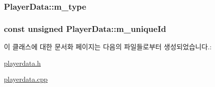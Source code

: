 \hypertarget{class_player_data_a3e4b8d9fcda3d2def5f0a79468a87903}{
\subsubsection[{m\-\_\-type}]{ Player\-Data\-::m\-\_\-type\hspace{0.3cm}{\ttfamily [private]}}}\label{class_player_data_a3e4b8d9fcda3d2def5f0a79468a87903}
\hypertarget{class_player_data_a2b6ed5c114b242c39eab3ec7c6622a5f}{
\subsubsection[{m\-\_\-unique\-Id}]{\setlength{\rightskip}{0pt plus 5cm}const unsigned Player\-Data\-::m\-\_\-unique\-Id\hspace{0.3cm}{\ttfamily [private]}}}\label{class_player_data_a2b6ed5c114b242c39eab3ec7c6622a5f}


이 클래스에 대한 문서화 페이지는 다음의 파일들로부터 생성되었습니다.\-:\begin{DoxyCompactItemize}
\item 
\hyperlink{playerdata_8h}{playerdata.\-h}\item 
\hyperlink{playerdata_8cpp}{playerdata.\-cpp}\end{DoxyCompactItemize}
